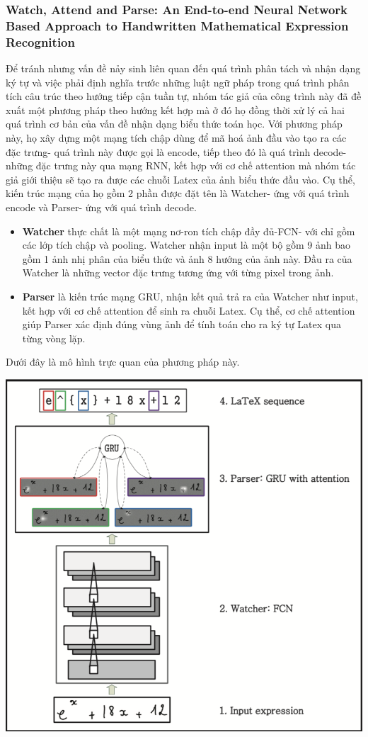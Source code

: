 \documentclass[a4paper,12pt]{article}
\begin{document}
	\subsubsection{Watch, Attend and Parse: An End-to-end Neural Network Based Approach to Handwritten Mathematical Expression Recognition\cite{zhang2017watch}} 
	Để tránh nhưng vấn đề nảy sinh liên quan đến quá trình phân tách và nhận dạng ký tự và việc phải định nghĩa trước những luật ngữ pháp trong quá trình phân tích câu trúc theo hướng tiếp cận tuần tự, nhóm tác giả của công trình này đã đề xuất một phương pháp theo hướng kết hợp mà ở đó họ đồng thời xử lý cả hai quá trình cơ bản của vấn đề nhận dạng biểu thức toán học. Với phương pháp này, họ xây dựng một mạng tích chập dùng để mã hoá ảnh đầu vào tạo ra các đặc trưng- quá trình này được gọi là encode, tiếp theo đó là quá trình decode- những đặc trưng này qua mạng RNN, kết hợp với cơ chế attention\cite{zhang2017watch} mà nhóm tác giả giới thiệu sẽ tạo ra được các chuỗi Latex của ảnh biểu thức đầu vào.
	Cụ thể, kiến trúc mạng của họ gồm 2 phần được đặt tên là Watcher- ứng với quá trình encode và Parser- ứng với quá trình decode.
	\begin{itemize}
		\item \textbf{Watcher} thực chất là một mạng nơ-ron tích chập đầy đủ-FCN- với chỉ gồm các lớp tích chập và pooling. Watcher nhận input là một bộ gồm 9 ảnh bao gồm 1 ảnh nhị phân của biểu thức và ảnh 8 hướng của ảnh này. Đầu ra của Watcher là những vector đặc trưng tương ứng với từng pixel trong ảnh. 
		\item \textbf{Parser} là kiến trúc mạng GRU\cite{cho2014properties}, nhận kết quả trả ra của Watcher như input, kết hợp với cơ chế attention để sinh ra chuỗi Latex. Cụ thể, cơ chế attention giúp Parser xác định đúng vùng ảnh để tính toán cho ra ký tự Latex qua từng vòng lặp.
	\end{itemize}
	Dưới đây là mô hình trực quan của phương pháp này.
	\begin{center}
		
		\centering
		\includegraphics[width=0.6\linewidth]{WAP}
		\vspace{0.5cm}
	\end{center}
	
\end{document}
